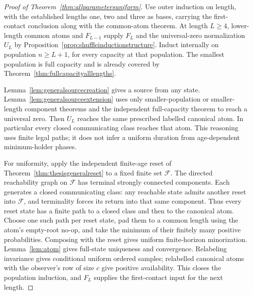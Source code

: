 \documentclass[11pt]{article}
\begin{document}
\begin{proof}[Proof of Theorem~\ref{thm:allparametersuniform}]
Use outer induction on length, with the established lengths one,
two and three as bases, carrying the first-contact conclusion along
with the common-atom theorem. At length $L\ge4$, lower-length
common atoms and $F_{L-1}$ supply $F_L$ and the universal-zero
normalization $U_L$ by
Proposition~\ref{prop:shuffleinductionstructure}. Induct internally
on population $n\ge L+1$, for every capacity at that population.
The smallest population is full capacity and is already covered by
Theorem~\ref{thm:fullcapacityalllengths}.

Lemma~\ref{lem:generalsourcecreation} gives a source from any state.
Lemma~\ref{lem:generalsourceextension} uses only smaller-population
or smaller-length component theorems and the independent
full-capacity theorem to reach a universal zero. Then $U_L$
reaches the same prescribed labelled canonical atom. In particular
every closed communicating class reaches that atom. This reasoning
uses finite legal paths; it does not infer a uniform duration from
age-dependent minimum-holder phases.

For uniformity, apply the independent finite-age reset of
Theorem~\ref{thm:thesisgeneralreset} to a fixed finite set $\mathcal F$.
The directed reachability graph on $\mathcal F$ has terminal strongly
connected components. Each generates a closed communicating class:
any reachable state admits another reset into $\mathcal F$, and
terminality forces its return into that same component. Thus every
reset state has a finite path to a closed class and then to the
canonical atom. Choose one such path per reset state, pad them to
a common length using the atom's empty-root no-op, and take the
minimum of their finitely many positive probabilities. Composing
with the reset gives uniform finite-horizon minorization.
Lemma~\ref{lem:atom} gives full-state uniqueness and convergence.
Relabeling invariance gives conditional uniform ordered samples;
relabelled canonical atoms with the observer's row of size $c$
give positive availability. This closes the population induction,
and $F_L$ supplies the first-contact input for the next length.
\end{proof}
\end{document}
